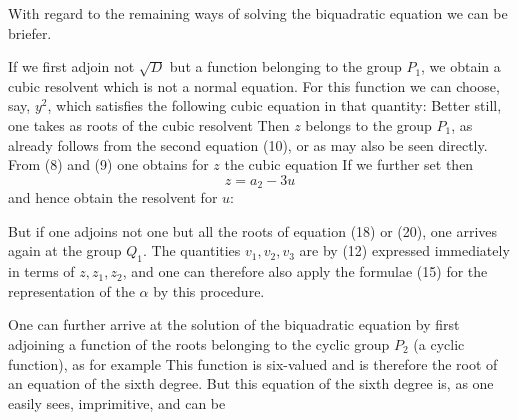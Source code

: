

With regard to the remaining ways of solving the biquadratic equation we can be briefer.

If we first adjoin not $\sqrt{D}$ but a function belonging to the group $P_1$, we obtain a cubic resolvent which is not a normal equation. For this function we can choose, say, $y^2$, which satisfies the following cubic equation in that quantity:
Better still, one takes as roots of the cubic resolvent
Then $z$ belongs to the group $P_1$, as already follows from the second equation (10), or as may also be seen directly. From (8) and (9) one obtains for $z$ the cubic equation
If we further set
then
\[
z = a_2 - 3u
\]
and hence obtain the resolvent for $u$:

But if one adjoins not one but all the roots of equation (18) or (20), one arrives again at the group $Q_1$. The quantities $v_1, v_2, v_3$ are by (12) expressed immediately in terms of $z, z_1, z_2$, and one can therefore also apply the formulae (15) for the representation of the $\alpha$ by this procedure.

One can further arrive at the solution of the biquadratic equation by first adjoining a function of the roots belonging to the cyclic group $P_2$ (a cyclic function), as for example
This function is six-valued and is therefore the root of an equation of the sixth degree. But this equation of the sixth degree is, as one easily sees, imprimitive, and can be
